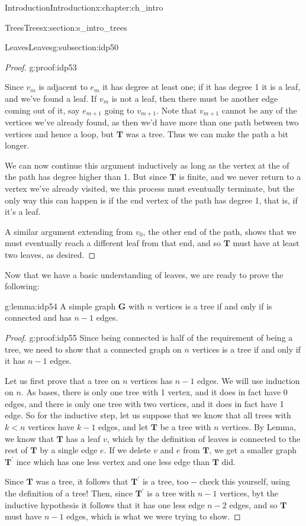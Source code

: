 \documentclass[oneside,10pt,]{book}
\numberwithin{equation}{section}
\newcommand{\bfG}{\mathbf{G}}
\newcommand{\bfT}{\mathbf{T}}
\newcommand{\lt}{<}
\begin{document}
\begin{chapterptx}{Introduction}{}{Introduction}{}{}{x:chapter:ch_intro}
\begin{sectionptx}{Trees}{}{Trees}{}{}{x:section:s_intro_trees}
\begin{subsectionptx}{Leaves}{}{Leaves}{}{}{g:subsection:idp50}
\begin{proof}{}{g:proof:idp53}
\par
Since \(v_m\) is adjacent to \(e_m\) it has degree at least one; if it has degree 1 it is a leaf, and we've found a leaf.  If \(v_m\) is not a leaf, then there must be another edge coming out of it, say \(e_{m+1}\) going to \(v_{m+1}\).  Note that \(v_{m+1}\) cannot be any of the vertices we've already found, as then we'd have more than one path between two vertices and hence a loop, but \(\bfT\) was a tree.  Thus we can make the path a bit longer.%
\par
We can now continue this argument inductively as long as the vertex at the of the path has degree higher than 1.  But since \(\bfT\) is finite, and we never return to a vertex we've already visited, we this process must eventually terminate, but the only way this can happen is if the end vertex of the path has degree 1, that is, if it's a leaf.%
\par
A similar argument extending from \(v_0\), the other end of the path, shows that we must eventually reach a different leaf from that end, and so \(\bfT\) must have at least two leaves, as desired.%
\end{proof}
 Now that we have a basic understanding of leaves, we are ready to prove the following: \begin{lemma}{}{}{g:lemma:idp54}%
A simple graph \(\bfG\) with \(n\) vertices is a tree if and only if is connected and has \(n-1\) edges.%
\end{lemma}
\begin{proof}{}{g:proof:idp55}
Since being connected is half of the requirement of being a tree, we need to show that a connected graph on \(n\) vertices is a tree if and only if it has \(n-1\) edges.%
\par
Let us first prove that a tree on \(n\) vertices has \(n-1\) edges.  We will use induction on \(n\).  As bases, there is only one tree with 1 vertex, and it does in fact have 0 edges, and there is only one tree with two vertices, and it does in fact have 1 edge.  So for the inductive step, let us suppose that we know that all trees with \(k\lt n\) vertices have \(k-1\) edges, and let \(\bfT\) be a tree with \(n\) vertices.  By Lemma, we know that \(\bfT\) has a leaf \(v\), which by the definition of leaves is connected to the rest of \(\bfT\) by a single edge \(e\).  If we delete \(v\) and \(e\) from \(\bfT\), we get a smaller graph \(\bfT^\prime\) ince which has one less vertex and one less edge than \(\bfT\) did.%
\par
Since \(\bfT\) was a tree, it follows that \(\bfT^\prime\) is a tree, too -{}-{} check this yourself, using the definition of a tree!  Then, since \(\bfT^\prime\) is a tree with \(n-1\) vertices, byt the inductive hypothesis it follows that it has one less edge \(n-2\) edges, and so \(\bfT\) must have \(n-1\) edges, which is what we were trying to show.%

\end{proof}
\end{subsectionptx}
\end{sectionptx}
\end{chapterptx}
\end{document}
